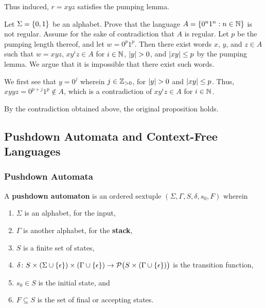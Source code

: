     Thus induced, \(r = x y z\) satisfies the pumping lemma.
\Epr

\Bxr
    Let \(\Sigma = \{0, 1\}\) be an alphabet. Prove that the language
    \(A = \{0^n 1^n : n \in \mathbb{N}\}\) is not regular.
\Exr
\Bsl
    Assume for the sake of contradiction that \(A\) is regular. Let \(p\) be the
    pumping length thereof, and let \(w = 0^p 1^p\). Then there exist words
    \(x\), \(y\), and \(z\in A\) such that \(w = x y z\), \(x y^i z \in A\) for
    \(i \in \mathbb{N}\), \(\lvert y\rvert > 0\), and \(\lvert x y\rvert \leq p\) by the pumping
    lemma. We argue that it is impossible that there exist such words.

    We first see that \(y = 0^j\) wherein \(j \in \mathbb{Z}_{>0}\), for \(\lvert y\rvert > 0\)
    and \(\lvert x y\rvert \leq p\). Thus, \(x y y z = 0^{p + j} 1^p \not\in A\), which
    is a contradiction of \(x y^i z \in A\) for \(i \in \mathbb{N}\).

    By the contradiction obtained above, the original proposition holds.
\Esl

\subsection{Pushdown Automata and Context-Free Languages}

\subsubsection{Pushdown Automata}

\Bdf
    A {\bf pushdown automaton} is an ordered sextuple \((\Sigma, \Gamma, S,
    \delta, s_0, F)\) wherein
    \begin{enumerate}
        \item \(\Sigma\) is an alphabet, for the input,
        \item \(\Gamma\) is another alphabet, for the {\bf stack},
        \item \(S\) is a finite set of states,
        \item \(\delta\colon S \times (\Sigma \cup \{\epsilon\}) \times
        (\Gamma \cup \{\epsilon\})\to\mathcal{P}\big(S \times (\Gamma \cup
        \{\epsilon\})\big)\) is the transition function,
        \item \(s_0 \in S\) is the initial state, and
        \item \(F \subseteq S\) is the set of final or accepting states.
    \end{enumerate}
\Edf

